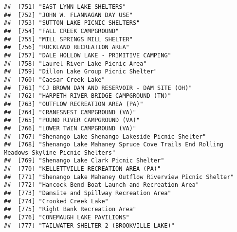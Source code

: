 \documentclass[
]{article}
\begin{document}
\begin{verbatim}
##  [751] "EAST LYNN LAKE SHELTERS"                                                             
##  [752] "JOHN W. FLANNAGAN DAY USE"                                                           
##  [753] "SUTTON LAKE PICNIC SHELTERS"                                                         
##  [754] "FALL CREEK CAMPGROUND"                                                               
##  [755] "MILL SPRINGS MILL SHELTER"                                                           
##  [756] "ROCKLAND RECREATION AREA"                                                            
##  [757] "DALE HOLLOW LAKE - PRIMITIVE CAMPING"                                                
##  [758] "Laurel River Lake Picnic Area"                                                       
##  [759] "Dillon Lake Group Picnic Shelter"                                                    
##  [760] "Caesar Creek Lake"                                                                   
##  [761] "CJ BROWN DAM AND RESERVOIR - DAM SITE (OH)"                                          
##  [762] "HARPETH RIVER BRIDGE CAMPGROUND (TN)"                                                
##  [763] "OUTFLOW RECREATION AREA (PA)"                                                        
##  [764] "CRANESNEST CAMPGROUND (VA)"                                                          
##  [765] "POUND RIVER CAMPGROUND (VA)"                                                         
##  [766] "LOWER TWIN CAMPGROUND (VA)"                                                          
##  [767] "Shenango Lake Shenango Lakeside Picnic Shelter"                                      
##  [768] "Shenango Lake Mahaney Spruce Cove Trails End Rolling Meadows Skyline Picnic Shelters"
##  [769] "Shenango Lake Clark Picnic Shelter"                                                  
##  [770] "KELLETTVILLE RECREATION AREA (PA)"                                                   
##  [771] "Shenango Lake Mahaney Outflow Riverview Picnic Shelter"                              
##  [772] "Hancock Bend Boat Launch and Recreation Area"                                        
##  [773] "Damsite and Spillway Recreation Area"                                                
##  [774] "Crooked Creek Lake"                                                                  
##  [775] "Right Bank Recreation Area"                                                          
##  [776] "CONEMAUGH LAKE PAVILIONS"                                                            
##  [777] "TAILWATER SHELTER 2 (BROOKVILLE LAKE)"                                               

\end{verbatim}
\end{document}
